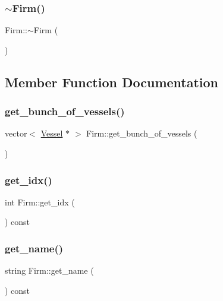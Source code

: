 \mbox{\label{class_firm_a7712fa88930763e92cfeb50ba181a306}} 
\subsubsection{\texorpdfstring{$\sim$Firm()}{~Firm()}}
{\footnotesize\ttfamily Firm\+::$\sim$\+Firm (\begin{DoxyParamCaption}{ }\end{DoxyParamCaption})}



\subsection{Member Function Documentation}
\mbox{\label{class_firm_ac8e5b174a55873c9ea206ce6ebcacf42}} 
\subsubsection{\texorpdfstring{get\_bunch\_of\_vessels()}{get\_bunch\_of\_vessels()}}
{\footnotesize\ttfamily vector$<$ \mbox{\hyperlink{class_vessel}{Vessel}} $\ast$ $>$ Firm\+::get\+\_\+bunch\+\_\+of\+\_\+vessels (\begin{DoxyParamCaption}{ }\end{DoxyParamCaption})}

\mbox{\label{class_firm_afaaaf278dabb1d2fd50663cc80982946}} 
\subsubsection{\texorpdfstring{get\_idx()}{get\_idx()}}
{\footnotesize\ttfamily int Firm\+::get\+\_\+idx (\begin{DoxyParamCaption}{ }\end{DoxyParamCaption}) const}

\mbox{\label{class_firm_a829fbfe777b4cc270da507fbb1121558}} 
\subsubsection{\texorpdfstring{get\_name()}{get\_name()}}
{\footnotesize\ttfamily string Firm\+::get\+\_\+name (\begin{DoxyParamCaption}{ }\end{DoxyParamCaption}) const}

